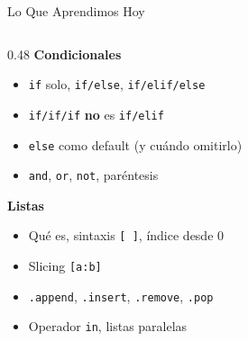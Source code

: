 \documentclass[aspectratio=169, 11pt]{beamer}
\begin{document}
\begin{frame}{Lo Que Aprendimos Hoy}
  \vspace{-6pt}
  \begin{columns}[T]
    \begin{column}{0.48\textwidth}
      {\footnotesize\color{arcaDark}\bfseries Condicionales}
      \vspace{3pt}
      {\footnotesize\color{textMuted}
      \begin{itemize}\setlength{\itemsep}{1pt}
        \item[{\color{codeGreen}\scriptsize\faCheck}]
          \texttt{if} solo, \texttt{if/else}, \texttt{if/elif/else}
        \item[{\color{codeGreen}\scriptsize\faCheck}]
          \texttt{if/if/if} \textbf{no} es \texttt{if/elif}
        \item[{\color{codeGreen}\scriptsize\faCheck}]
          \texttt{else} como default (y cuándo omitirlo)
        \item[{\color{codeGreen}\scriptsize\faCheck}]
          \texttt{and}, \texttt{or}, \texttt{not}, paréntesis
      \end{itemize}
      }

      \vspace{4pt}
      {\footnotesize\color{arcaDark}\bfseries Listas}
      \vspace{3pt}
      {\footnotesize\color{textMuted}
      \begin{itemize}\setlength{\itemsep}{1pt}
        \item[{\color{codeGreen}\scriptsize\faCheck}]
          Qué es, sintaxis \texttt{[ ]}, índice desde 0
        \item[{\color{codeGreen}\scriptsize\faCheck}]
          Slicing \texttt{[a:b]}
        \item[{\color{codeGreen}\scriptsize\faCheck}]
          \texttt{.append}, \texttt{.insert}, \texttt{.remove}, \texttt{.pop}
        \item[{\color{codeGreen}\scriptsize\faCheck}]
          Operador \texttt{in}, listas paralelas
      \end{itemize}
      }
    \end{column}


\end{columns}
\end{frame}
\end{document}
